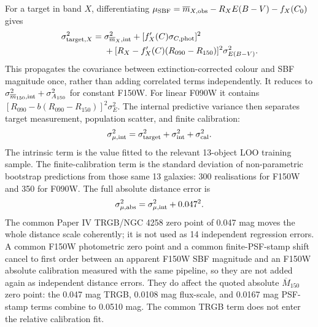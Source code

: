 \documentclass[nodoi,nocopyright]{pas}
\newcommand{\mbar}{\overline{m}}
\newcommand{\Mbar}{\overline{M}}
\begin{document}
For a target in band $X$, differentiating
$\mu_{\rm SBF}=\mbar_{X,\rm obs}-R_XE(B-V)-f_X(C_0)$ gives
\begin{align}
 \sigma^2_{{\rm target},X}={}&\sigma^2_{\mbar_X,\rm int}
 +[f'_X(C)\sigma_{C,\rm phot}]^2\\
 &+[R_X-f'_X(C)(R_{090}-R_{150})]^2\sigma^2_{E(B-V)}.
 \label{eq:target-error}
\end{align}
This propagates the covariance between extinction-corrected colour and SBF
magnitude once, rather than adding correlated terms independently. It reduces
to $\sigma^2_{\mbar_{150},\rm int}+\sigma^2_{A_{150}}$ for constant F150W.
For linear F090W it contains
$[R_{090}-b(R_{090}-R_{150})]^2\sigma_E^2$. The internal predictive variance
then separates target measurement, population scatter, and finite calibration:
\begin{equation}
 \sigma^2_{\mu,\rm int}=
 \sigma^2_{\rm target}+\sigma^2_{\rm int}+\sigma^2_{\rm cal}.
 \label{eq:predictive-error}
\end{equation}
The intrinsic term is the value fitted to the relevant 13-object LOO training
sample. The finite-calibration term is the standard deviation of
non-parametric bootstrap predictions from those same 13 galaxies: 300
realisations for F150W and 350 for F090W. The full
absolute distance error is
\begin{equation}
 \sigma^2_{\mu,\rm abs}=\sigma^2_{\mu,\rm int}+0.047^2.
 \label{eq:absolute-distance-error}
\end{equation}
The common Paper IV TRGB/NGC 4258 zero point of 0.047 mag
\citep{Chazov2026,Reid2019} moves the whole
distance scale coherently; it is not used as 14 independent regression errors.
A common F150W
photometric zero point and a common finite-PSF-stamp shift cancel to first
order between an apparent F150W SBF magnitude and an F150W absolute
calibration measured with the same pipeline, so they are not added again as
independent distance errors. They do affect the quoted absolute $\Mbar_{150}$
zero point: the 0.047 mag TRGB, 0.0108 mag flux-scale, and 0.0167 mag
PSF-stamp terms combine to 0.0510 mag. The common TRGB term does not enter the
relative calibration fit.
\end{document}
